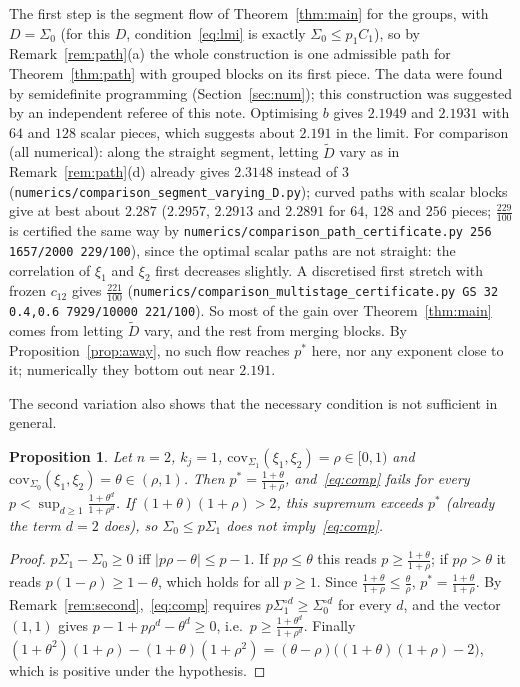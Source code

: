 \documentclass[11pt]{amsart}
\newtheorem{proposition}[theorem]{Proposition}
\theoremstyle{definition}
\begin{document}
The first step is the segment flow of Theorem~\ref{thm:main} for the groups, with $D=\Sigma_0$ (for this $D$,
condition~\eqref{eq:lmi} is exactly $\Sigma_0\le p_1C_1$), so by Remark~\ref{rem:path}(a) the whole construction is one
admissible path for Theorem~\ref{thm:path} with grouped blocks on its first piece. The data were found by
semidefinite programming (Section~\ref{sec:num}); this construction was suggested by an independent referee of this
note. Optimising $b$ gives $2.1949$ and $2.1931$ with $64$ and $128$ scalar pieces, which suggests about $2.191$ in the
limit. For comparison (all numerical): along the straight segment, letting $\tilde D$ vary as in
Remark~\ref{rem:path}(d) already gives $2.3148$ instead of $3$
(\texttt{numerics/comparison\_segment\_varying\_D.py}); curved paths with scalar blocks give at best about
$2.287$ ($2.2957$, $2.2913$ and $2.2891$ for $64$, $128$ and $256$ pieces; $\frac{229}{100}$ is certified the same way by
\texttt{numerics/comparison\_path\_certificate.py 256 1657/2000 229/100}), since the optimal scalar paths are not
straight: the correlation of $\xi_1$ and $\xi_2$ first decreases slightly. A discretised first stretch with frozen
$c_{12}$ gives $\frac{221}{100}$ (\texttt{numerics/comparison\_multistage\_certificate.py GS 32 0.4,0.6 7929/10000
221/100}). So most of the gain over Theorem~\ref{thm:main} comes from letting $\tilde D$ vary, and the rest from merging
blocks. By Proposition~\ref{prop:away}, no such flow reaches $p^*$ here, nor any exponent close to it; numerically they
bottom out near $2.191$.

The second variation also shows that the necessary condition is not sufficient in general.

\begin{proposition}\label{prop:notsuff}
Let $n=2$, $k_j=1$, $\mathrm{cov}_{\Sigma_1}(\xi_1,\xi_2)=\rho\in[0,1)$ and
$\mathrm{cov}_{\Sigma_0}(\xi_1,\xi_2)=\theta\in(\rho,1)$. Then $p^*=\frac{1+\theta}{1+\rho}$, and~\eqref{eq:comp} fails for
every $p<\sup_{d\ge1}\frac{1+\theta^d}{1+\rho^d}$. If $(1+\theta)(1+\rho)>2$, this supremum exceeds $p^*$ (already the
term $d=2$ does), so $\Sigma_0\le p\Sigma_1$ does not imply~\eqref{eq:comp}.
\end{proposition}

\begin{proof}
$p\Sigma_1-\Sigma_0\ge0$ iff $|p\rho-\theta|\le p-1$. If $p\rho\le\theta$ this reads $p\ge\frac{1+\theta}{1+\rho}$; if
$p\rho>\theta$ it reads $p(1-\rho)\ge1-\theta$, which holds for all $p\ge1$. Since $\frac{1+\theta}{1+\rho}\le\frac\theta\rho$,
$p^*=\frac{1+\theta}{1+\rho}$. By Remark~\ref{rem:second},~\eqref{eq:comp} requires $p\Sigma_1^{\circ d}\ge\Sigma_0^{\circ d}$
for every $d$, and the vector $(1,1)$ gives $p-1+p\rho^d-\theta^d\ge0$, i.e.\ $p\ge\frac{1+\theta^d}{1+\rho^d}$. Finally
$(1+\theta^2)(1+\rho)-(1+\theta)(1+\rho^2)=(\theta-\rho)\big((1+\theta)(1+\rho)-2\big)$, which is positive under the
hypothesis.
\end{proof}
\end{document}
